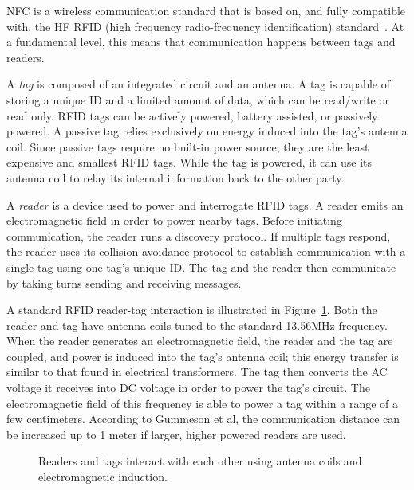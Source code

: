 \documentclass{sig-alternate}
\begin{document}
NFC is a wireless communication standard that is based on, and fully compatible with, the HF RFID (high frequency radio-frequency identification) standard~\cite{Gum2013}. At a fundamental level, this means that communication happens between tags and readers.

A \textit{tag} is composed of an integrated circuit and an antenna. A tag is capable of storing a unique ID and a limited amount of data, which can be read/write or read only. RFID tags can be actively powered, battery assisted, or passively powered. A passive tag relies exclusively on energy induced into the tag's antenna coil. Since passive tags require no built-in power source, they are the least expensive and smallest RFID tags. While the tag is powered, it can use its antenna coil to relay its internal information back to the other party.~\cite{wiki:RFID}

A \textit{reader} is a device used to power and interrogate RFID tags. A reader emits an electromagnetic field in order to power nearby tags. Before initiating communication, the reader runs a discovery protocol. If multiple tags respond, the reader uses its collision avoidance protocol to establish communication with a single tag using one tag's unique ID. The tag and the reader then communicate by taking turns sending and receiving messages.~\cite{Gum2013}

A standard RFID reader-tag interaction is illustrated in Figure~\ref{fig:rfid}. Both the reader and tag have antenna coils tuned to the standard 13.56MHz frequency. When the reader generates an electromagnetic field, the reader and the tag are coupled, and power is induced into the tag's antenna coil; this energy transfer is similar to that found in electrical transformers. The tag then converts the AC voltage it receives into DC voltage in order to power the tag's circuit. The electromagnetic field of this frequency is able to power a tag within a range of a few centimeters. According to Gummeson et al, the communication distance can be increased up to 1 meter if larger, higher powered readers are used.~\cite{Gum2013}


\begin{figure}
\centering
{}
\caption{Readers and tags interact with each other using antenna coils and electromagnetic induction.}
\label{fig:rfid}
\end{figure}
\end{document}
